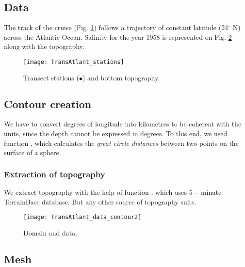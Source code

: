 \subsection{Data}

The track of the cruise (Fig. \ref{fig:transectprofiles}) follows a trajectory of constant latitude (24$^{\circ}$ N) across the Atlantic Ocean. Salinity for the year 1958 is represented on Fig. \ref{fig:domaindata} along with the topography. 

\begin{figure}[htpb]
\centering
\texttt{[image: TransAtlant\_stations]}
\caption{Transect stations ($\bullet$) and bottom topography.\label{fig:transectprofiles}}
\end{figure}

\subsection{Contour creation}

We have to convert degrees of longitude into kilometres to be coherent with the units, since the depth cannot be expressed in degrees. To this end, we used \matlab function , which calculates the \textit{great circle distances} between two points on the surface of a sphere.  

\subsubsection{Extraction of topography}

We extract topography with the help of \matlab function  , which uses $5-$minute TerrainBase database. But any other source of topography suits.
				
\begin{figure}[H]
\centering
\texttt{[image: TransAtlant\_data\_contour2]}
\caption{Domain and data.\label{fig:domaindata}}
\end{figure}


%
%

\subsection{Mesh} 

